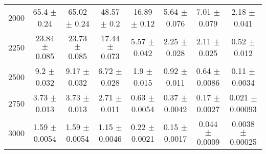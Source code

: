 \begin{footnotesize}
\begin{tabular}{c|c|c|c|c|c|c|c}
2000 & 65.4 $\pm$ 0.24 & 65.02 $\pm$ 0.24 & 48.57 $\pm$ 0.2 & 16.89 $\pm$ 0.12 & 5.64 $\pm$ 0.076 & 7.01 $\pm$ 0.079 & 2.18 $\pm$ 0.041\\ 
2250 & 23.84 $\pm$ 0.085 & 23.73 $\pm$ 0.085 & 17.44 $\pm$ 0.073 & 5.57 $\pm$ 0.042 & 2.25 $\pm$ 0.028 & 2.11 $\pm$ 0.025 & 0.52 $\pm$ 0.012\\ 
2500 & 9.2 $\pm$ 0.032 & 9.17 $\pm$ 0.032 & 6.72 $\pm$ 0.028 & 1.9 $\pm$ 0.015 & 0.92 $\pm$ 0.011 & 0.64 $\pm$ 0.0086 & 0.11 $\pm$ 0.0034\\ 
2750 & 3.73 $\pm$ 0.013 & 3.73 $\pm$ 0.013 & 2.71 $\pm$ 0.011 & 0.63 $\pm$ 0.0054 & 0.37 $\pm$ 0.0042 & 0.17 $\pm$ 0.0027 & 0.021 $\pm$ 0.00093\\ 
3000 & 1.59 $\pm$ 0.0054 & 1.59 $\pm$ 0.0054 & 1.15 $\pm$ 0.0046 & 0.22 $\pm$ 0.0021 & 0.15 $\pm$ 0.0017 & 0.044 $\pm$ 0.0009 & 0.0038 $\pm$ 0.00025\\ 
\hline\hline 
\end{tabular} 
\end{footnotesize} 
\newline 
